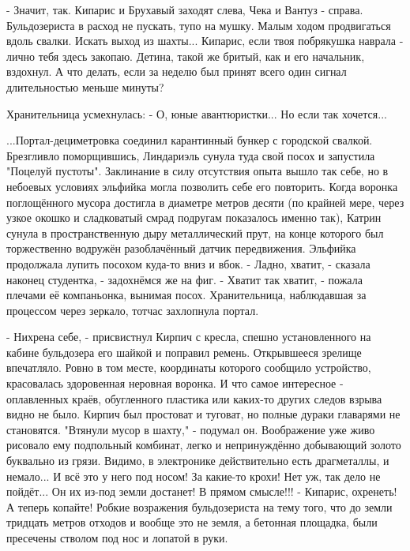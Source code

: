  - Значит, так. Кипарис и Брухавый заходят слева, Чека и Вантуз - справа. Бульдозериста в расход не пускать, тупо на мушку. Малым ходом продвигаться вдоль свалки. Искать выход из шахты... Кипарис, если твоя побрякушка наврала - лично тебя здесь закопаю.
Детина, такой же бритый, как и его начальник, вздохнул. А что делать, если за неделю был принят всего один сигнал длительностью меньше минуты?


Хранительница усмехнулась:
 - О, юные авантюристки... Но если так хочется...

...Портал-дециметровка соединил карантинный бункер с городской свалкой. Брезгливло поморщившись, Линдариэль сунула туда свой посох и запустила "Поцелуй пустоты". Заклинание в силу отсутствия опыта вышло так себе, но в небоевых условиях эльфийка могла позволить себе его повторить. Когда воронка поглощённого мусора достигла в диаметре метров десяти (по крайней мере, через узкое окошко и сладковатый смрад подругам показалось именно так), Катрин сунула в пространственную дыру металлический прут, на конце которого был торжественно водружён разоблачённый датчик передвижения. Эльфийка продолжала лупить посохом куда-то вниз и вбок.
 - Ладно, хватит, - сказала наконец студентка, - задохнёмся же на фиг.
 - Хватит так хватит, - пожала плечами её компаньонка, вынимая посох. Хранительница, наблюдавшая за процессом через зеркало, тотчас захлопнула портал.


 - Нихрена себе, - присвистнул Кирпич с кресла, спешно установленного на кабине бульдозера его шайкой и поправил ремень.
Открывшееся зрелище впечатляло. Ровно в том месте, координаты которого сообщило устройство, красовалась здоровенная неровная воронка. И что самое интересное - оплавленных краёв, обугленного пластика или каких-то других следов взрыва видно не было. Кирпич был простоват и туговат, но полные дураки главарями не становятся. "Втянули мусор в шахту," - подумал он. Воображение уже живо рисовало ему подпольный комбинат, легко и непринуждённо добывающий золото буквально из грязи. Видимо, в электронике действительно есть драгметаллы, и немало... И всё это у него под носом! За какие-то крохи! Нет уж, так дело не пойдёт... Он их из-под земли достанет! В прямом смысле!!!
 - Кипарис, охренеть! А теперь копайте!
Робкие возражения бульдозериста на тему того, что до земли тридцать метров отходов и вообще это не земля, а бетонная площадка, были пресечены стволом под нос и лопатой в руки.





